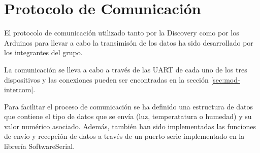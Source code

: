 \section{Protocolo de Comunicaci\'on}\label{sec:comunicacion}

El protocolo de comunicaci\'on utilizado tanto por la Discovery como
por los Arduinos para llevar a cabo la transimis\'on de los datos ha
sido desarrollado por los integrantes del grupo.

La comunicaci\'on se lleva a cabo a trav\'es de las UART de cada uno
de los tres dispositivos y las conexiones pueden ser encontradas en la
secci\'on \ref{sec:mod-intercom}.

Para facilitar el proceso de comunicaci\'on se ha definido una
estructura de datos que contiene el tipo de datos que se env\'ia (luz,
temperatatura o humedad) y su valor num\'erico asociado. Adem\'as,
tambi\'en han sido implementadas las funciones de env\'io y
recepci\'on de datos a trav\'es de un puerto serie implementado en la
librer\'ia SoftwareSerial.
